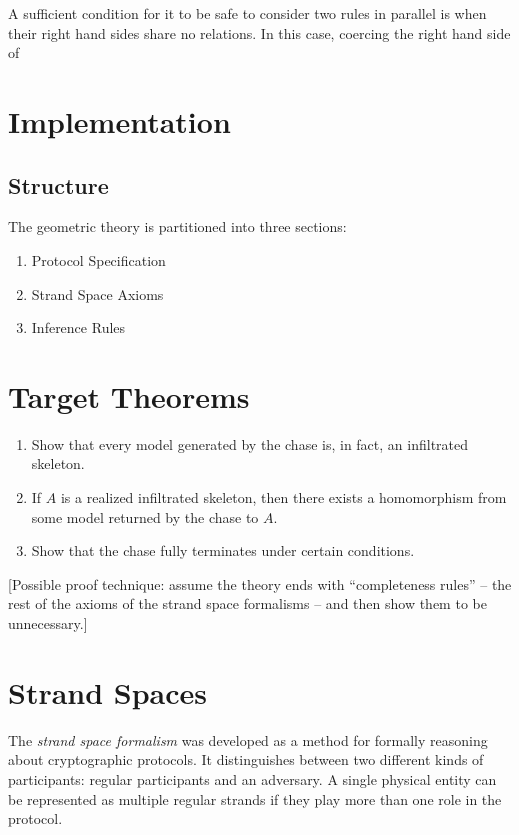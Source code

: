 \documentclass[12pt]{article}
\begin{document}
  A sufficient condition for it to be safe to consider two rules in
  parallel is when their right hand sides share no relations. In this
  case, coercing the right hand side of



\section{Implementation}

\subsection{Structure}
  The geometric theory is partitioned into three sections:

  \begin{enumerate}
  \item Protocol Specification
  \item Strand Space Axioms
  \item Inference Rules
  \end{enumerate}

\section{Target Theorems}

  \begin{enumerate}
  \item
    Show that every model generated by the chase is, in fact, an
    infiltrated skeleton.
  \item
    If $A$ is a realized infiltrated skeleton, then there exists a
    homomorphism from some model returned by the chase to $A$.
  \item
    Show that the chase fully terminates under certain conditions.
  \end{enumerate}

  [Possible proof technique: assume the theory ends with
    ``completeness rules'' -- the rest of the axioms of the strand
    space formalisms -- and then show them to be unnecessary.]

\section{Strand Spaces}

  The \emph{strand space formalism} was developed as a method for
  formally reasoning about cryptographic protocols. It distinguishes
  between two different kinds of participants: regular participants
  and an adversary. A single physical entity can be represented as
  multiple regular strands if they play more than one role in the
  protocol.
\end{document}

